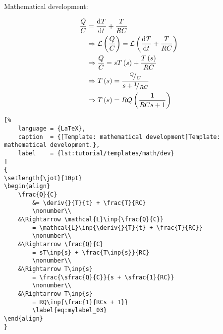 
\noindent Mathematical development:

{
\setlength{\jot}{10pt}
\begin{align}
    \frac{Q}{C}
        &= \frac{\text{d}^{}T}{\text{d}t^{}} + \frac{T}{RC}
        \nonumber\\
    &\Rightarrow \mathcal{L}\left(\frac{Q}{C}\right)
        = \mathcal{L}\left(\frac{\text{d}^{}T}{\text{d}t^{}} + \frac{T}{RC}\right)
        \nonumber\\
    &\Rightarrow \frac{Q}{C}
        = sT\left(s\right) + \frac{T\left(s\right)}{RC}
        \nonumber\\
    &\Rightarrow T\left(s\right)
        = \frac{{}^{Q}\!/_{C}}{s + {}^{1}\!/_{RC}}
        \nonumber\\
    &\Rightarrow T\left(s\right)
        = RQ\left(\frac{1}{RCs + 1}\right)
        \label{eq:mylabel_03}
\end{align}
}

\begin{lstlisting}[%
    language = {LaTeX},
    caption  = {[Template: mathematical development]Template: mathematical development.},
    label    = {lst:tutorial/templates/math/dev}
]
{
\setlength{\jot}{10pt}
\begin{align}
    \frac{Q}{C}
        &= \deriv{}{T}{t} + \frac{T}{RC}
        \nonumber\\
    &\Rightarrow \mathcal{L}\inp{\frac{Q}{C}}
        = \mathcal{L}\inp{\deriv{}{T}{t} + \frac{T}{RC}}
        \nonumber\\
    &\Rightarrow \frac{Q}{C}
        = sT\inp{s} + \frac{T\inp{s}}{RC}
        \nonumber\\
    &\Rightarrow T\inp{s}
        = \frac{\sfrac{Q}{C}}{s + \sfrac{1}{RC}}
        \nonumber\\
    &\Rightarrow T\inp{s}
        = RQ\inp{\frac{1}{RCs + 1}}
        \label{eq:mylabel_03}
\end{align}
}
\end{lstlisting}